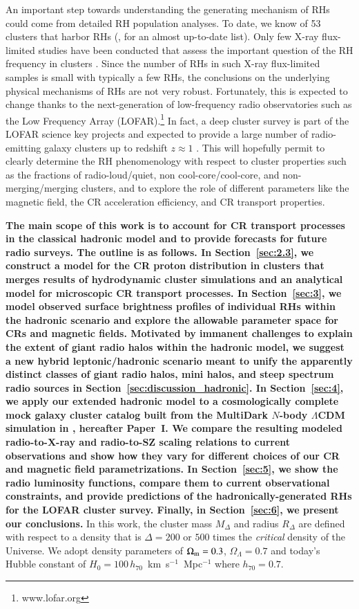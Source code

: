 \documentclass[useAMS,usenatbib]{mn2e}
\begin{document}
An important step towards understanding the generating mechanism of RHs could
come from detailed RH population analyses. To date, we know of 53 clusters that
harbor RHs (\citealp{2012A&ARv..20...54F}, for an almost up-to-date list). Only
few X-ray flux-limited studies have been conducted that assess the important
question of the RH frequency in clusters \citep{1999NewA....4..141G,
  VenturiGMRT_2,2013arXiv1306.3102K}. Since the number of RHs in such X-ray
flux-limited samples is small with typically a few RHs, the conclusions on the
underlying physical mechanisms of RHs are not very robust. Fortunately, this is
expected to change thanks to the next-generation of low-frequency radio
observatories such as the Low Frequency Array (LOFAR).\footnote{www.lofar.org}
In fact, a deep cluster survey is part of the LOFAR science key projects and
expected to provide a large number of radio-emitting galaxy clusters up to
redshift $z\approx1$ \citep{2012JApA..tmp...34R}. This will hopefully permit to
clearly determine the RH phenomenology with respect to cluster properties such
as the fractions of radio-loud/quiet, non cool-core/cool-core, and
non-merging/merging clusters, and to explore the role of different parameters
like the magnetic field, the CR acceleration efficiency, and CR transport
properties.

{\bf The main scope of this work is to account for CR transport processes in the
  classical hadronic model and to provide forecasts for future radio
  surveys. The outline is as follows. In Section~\ref{sec:2.3}, we construct a
  model for the CR proton distribution in clusters that merges results of
  hydrodynamic cluster simulations and an analytical model for microscopic CR
  transport processes. In Section~\ref{sec:3}, we model observed surface
  brightness profiles of individual RHs within the hadronic scenario and explore
  the allowable parameter space for CRs and magnetic fields. Motivated by
  immanent challenges to explain the extent of giant radio halos within the
  hadronic model, we suggest a new hybrid leptonic/hadronic scenario meant to
  unify the apparently distinct classes of giant radio halos, mini halos, and
  steep spectrum radio sources in Section~\ref{sec:discussion_hadronic}. In
  Section~\ref{sec:4}, we apply our extended hadronic model to a cosmologically
  complete mock galaxy cluster catalog built from the MultiDark $N$-body
  $\Lambda$CDM simulation in \cite{paper1}, hereafter Paper~I.  We compare the
  resulting modeled radio-to-X-ray and radio-to-SZ scaling relations to current
  observations and show how they vary for different choices of our CR and
  magnetic field parametrizations. In Section~\ref{sec:5}, we show the radio
  luminosity functions, compare them to current observational constraints, and
  provide predictions of the hadronically-generated RHs for the LOFAR cluster
  survey. Finally, in Section~\ref{sec:6}, we present our conclusions.} In this
work, the cluster mass $M_{\Delta}$ and radius $R_{\Delta}$ are defined with
respect to a density that is $\Delta=200$ or $500$ times the
\emph{critical} density of the Universe. We adopt density parameters of
$\Omega_{{\mathrm{m}}}=0.3$, $\Omega_{\Lambda}=0.7$ and today's Hubble constant of
$H_0 = 100 \, h_{70}$~km~s$^{-1}$~Mpc$^{-1}$ where $h_{70} = 0.7$.
\end{document}

